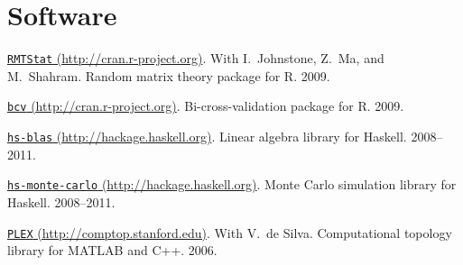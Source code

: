 \documentclass[10pt,letterpaper]{article}
\renewenvironment{itemize}{
  \begin{list}{}{
    \setlength{\leftmargin}{1.5em}
    \setlength{\itemsep}{0.25em}
    \setlength{\parskip}{0pt}
    \setlength{\parsep}{0.25em}
  }
}{
  \end{list}
}
\begin{document}
\section*{Software}
\begin{itemize}
\item \href{http://cran.r-project.org/web/packages/RMTstat/index.html}
{\texttt{RMTStat} (http://cran.r-project.org)}.
With I.~Johnstone, Z.~Ma, and M.~Shahram.
Random matrix theory package for R.
2009.

\item \href{http://cran.r-project.org/web/packages/bcv/index.html}
{\texttt{bcv} (http://cran.r-project.org)}.
Bi-cross-validation package for R.
2009.

\item \href{http://hackage.haskell.org/cgi-bin/hackage-scripts/package/blas}
{\texttt{hs-blas} (http://hackage.haskell.org)}.
Linear algebra library for Haskell.
2008--2011.

\item \href{http://hackage.haskell.org/cgi-bin/hackage-scripts/package/monte-carlo}
{\texttt{hs-monte-carlo} (http://hackage.haskell.org)}.
Monte Carlo simulation library for Haskell.
2008--2011.

\item \href{http://comptop.stanford.edu/programs/plex.html}
{\texttt{PLEX} (http://comptop.stanford.edu)}.
With V.\ de Silva.
Computational topology library for \textsc{MATLAB} and C++.
2006.

\end{itemize}
\end{document}
